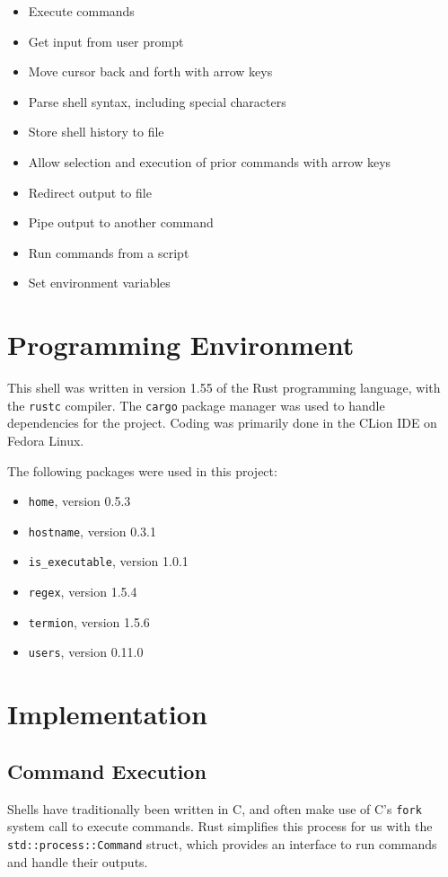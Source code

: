 \documentclass[12pt,twoside]{report} %
\begin{document}
	\begin{itemize}[noitemsep,topsep=0pt]
	    \item Execute commands
	    \item Get input from user prompt
	    \item Move cursor back and forth with arrow keys
	    \item Parse shell syntax, including special characters
	    \item Store shell history to file
	    \item Allow selection and execution of prior commands with arrow keys
	    \item Redirect output to file
	    \item Pipe output to another command
	    \item Run commands from a script
	    \item Set environment variables
	\end{itemize}
	
	\section{Programming Environment} \label{sec:programming-environment}
	This shell was written in version 1.55 of the Rust programming language, with the \verb|rustc| compiler. The \verb|cargo| package manager was used to handle dependencies for the project. Coding was primarily done in the CLion IDE on Fedora Linux.
	
	The following packages were used in this project:
	\begin{itemize}[noitemsep,topsep=0pt]
		\item \verb|home|, version 0.5.3
		\item \verb|hostname|, version 0.3.1
		\item \verb|is_executable|, version 1.0.1
		\item \verb|regex|, version 1.5.4
		\item \verb|termion|, version 1.5.6
		\item \verb|users|, version 0.11.0
	\end{itemize}

	\section{Implementation} \label{sec:implementation}

	\subsection{Command Execution} \label{sec:command-execution}
	Shells have traditionally been written in C, and often make use of C's \verb|fork| system call to execute commands. Rust simplifies this process for us with the \verb|std::process::Command| struct, which provides an interface to run commands and handle their outputs.
\end{document}

